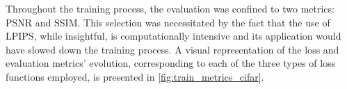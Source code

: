 Throughout the training process, the evaluation was confined to two metrics: PSNR and SSIM. This selection was necessitated by the fact that the use of LPIPS, while insightful, is computationally intensive and its application would have slowed down the training process. A visual representation of the loss and evaluation metrics' evolution, corresponding to each of the three types of loss functions employed, is presented in \autoref{fig:train_metrics_cifar}.
\begin{table}[ht]
    \centering
    \caption[Baseline values on the $128\stimes 128$ random-cropped COCO dataset]{Baseline values on the $128\stimes 128$ random-cropped COCO dataset\\(random shapes mask generation)}
    \label{table:coco-base}
\end{table}

